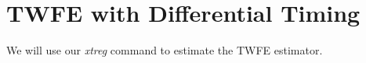 \documentclass[
]{book}
\newenvironment{Shaded}{\begin{snugshade}}{\end{snugshade}}
\newcommand{\FunctionTok}[1]{\textcolor[rgb]{0.13,0.29,0.53}{\textbf{#1}}}
\newcommand{\KeywordTok}[1]{\textcolor[rgb]{0.13,0.29,0.53}{\textbf{#1}}}
\newcommand{\NormalTok}[1]{#1}
\newcommand{\OtherTok}[1]{\textcolor[rgb]{0.56,0.35,0.01}{#1}}
\begin{document}
\section{TWFE with Differential Timing}\label{twfe-with-differential-timing}

We will use our \emph{xtreg} command to estimate the TWFE estimator.

\begin{Shaded}
\end{Shaded}
\end{document}

